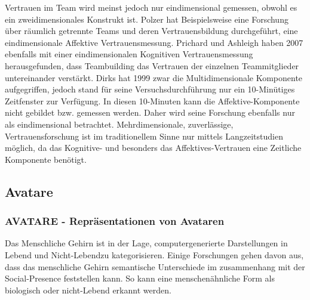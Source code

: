 \documentclass[a4paper,11pt]{article}%
\renewcommand{\\}{\vspace*{0.5\baselineskip} \newline}
\begin{document}
Vertrauen im Team wird meinst jedoch nur eindimensional gemessen, obwohl es ein zweidimensionales Konstrukt ist.
Polzer hat Beispielsweise eine Forschung über räumlich getrennte Teams und deren Vertrauensbildung durchgeführt, eine eindimensionale Affektive Vertrauensmessung. \citep[p.682]{polzer2006extending}
Prichard und Ashleigh haben 2007 ebenfalls mit einer eindimensionalen Kognitiven Vertrauensmessung herausgefunden, dass Teambuilding das Vertrauen der einzelnen Teammitglieder untereinander verstärkt. \citep[p.704]{prichard2007effects}
Dirks hat 1999 zwar die Multidimensionale Komponente aufgegriffen, jedoch stand für seine Versuchsdurchführung nur ein 10-Minütiges Zeitfenster zur Verfügung. In diesen 10-Minuten kann die Affektive-Komponente nicht gebildet bzw. gemessen werden. \citep[p.445]{mayer1995integrative} Daher wird seine Forschung ebenfalls nur als eindimensional betrachtet.
Mehrdimensionale, zuverlässige, Vertrauensforschung ist im traditionellem Sinne nur mittels Langzeitstudien möglich, da das Kognitive- und besonders das Affektives-Vertrauen eine Zeitliche Komponente benötigt. \citep{jones1998experience} \\
	\newpage
	
\subsection{Avatare}
		
\subsubsection{AVATARE - Repräsentationen von Avataren}

Das Menschliche Gehirn ist in der Lage, computergenerierte Darstellungen in \flqq Lebend und Nicht-Lebend\frqq zu kategorisieren. Einige Forschungen gehen davon aus, dass das menschliche Gehirn semantische Unterschiede im zusammenhang mit der Social-Presence feststellen kann. So kann eine menschenähnliche Form als biologisch oder nicht-Lebend erkannt werden. 
\end{document}

